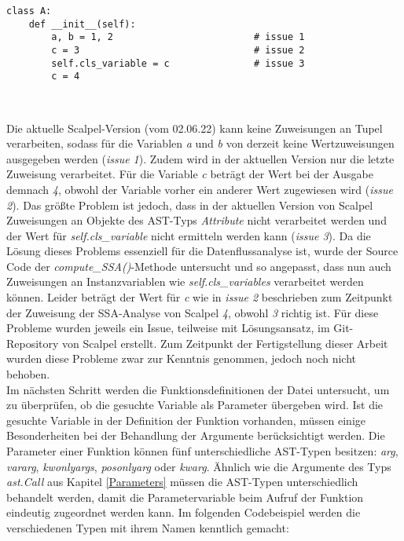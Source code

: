\documentclass[german,bachelor]{swsLeipzig}
\begin{document}
\noindent\begin{minipage}{\linewidth}
\begin{lstlisting}[language=iPython, frame=single, basicstyle=\small, label=scalpel_limits, caption={Limitierungen der Datenflussanalyse},captionpos=b]
class A:
    def __init__(self):
        a, b = 1, 2                         # issue 1
        c = 3                               # issue 2
        self.cls_variable = c               # issue 3
        c = 4
\end{lstlisting}
\end{minipage}
\

\noindent Die aktuelle Scalpel-Version (vom 02.06.22) kann keine Zuweisungen an Tupel verarbeiten, sodass für die Variablen \textit{a} und \textit{b}
von derzeit keine Wertzuweisungen ausgegeben werden (\textit{issue 1}).
Zudem wird in der aktuellen Version nur die letzte Zuweisung verarbeitet.
Für die Variable \textit{c} beträgt der Wert bei der Ausgabe demnach \textit{4}, obwohl der Variable vorher ein anderer
Wert zugewiesen wird (\textit{issue 2}).
Das größte Problem ist jedoch, dass in der aktuellen Version von Scalpel Zuweisungen an Objekte des AST-Typs \textit{Attribute} nicht verarbeitet werden
und der Wert für \textit{self.cls\_variable} nicht ermitteln werden kann (\textit{issue 3}).
Da die Lösung dieses Problems essenziell für die Datenflussanalyse ist, wurde der Source Code der \textit{compute\_SSA()}-Methode
untersucht und so angepasst, dass nun auch Zuweisungen an Instanzvariablen wie \textit{self.cls\_variables} verarbeitet werden können.
Leider beträgt der Wert für \textit{c} wie in \textit{issue 2} beschrieben zum Zeitpunkt der Zuweisung der SSA-Analyse von Scalpel \textit{4}, obwohl
\textit{3} richtig ist.
Für diese Probleme wurden jeweils ein Issue, teilweise mit Lösungsansatz, im Git-Repository von Scalpel erstellt.
Zum Zeitpunkt der Fertigstellung dieser Arbeit wurden diese Probleme zwar zur Kenntnis genommen, jedoch noch nicht behoben.\\

\noindent Im nächsten Schritt werden die Funktionsdefinitionen der Datei untersucht, um zu überprüfen, ob die gesuchte Variable als
Parameter übergeben wird.
Ist die gesuchte Variable in der Definition der Funktion vorhanden, müssen einige Besonderheiten bei der Behandlung der Argumente
berücksichtigt werden.
Die Parameter einer Funktion können fünf unterschiedliche AST-Typen besitzen: \textit{arg}, \textit{vararg}, \textit{kwonlyargs},
\textit{posonlyarg} oder \textit{kwarg}.
Ähnlich wie die Argumente des Typs \textit{ast.Call} aus Kapitel \ref{Parameters} müssen die AST-Typen unterschiedlich behandelt werden, damit die Parametervariable
beim Aufruf der Funktion eindeutig zugeordnet werden kann.
Im folgenden Codebeispiel werden die verschiedenen Typen mit ihrem Namen kenntlich gemacht: \\
\end{document}
